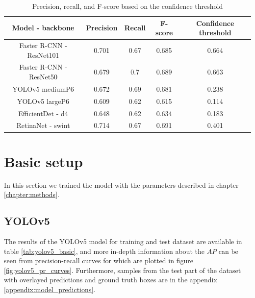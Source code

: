 \begin{table}
    \begin{tabular}{c||c|c|c|c}
        Model - backbone         & Precision & Recall & F-score & Confidence threshold \\ \hline \hline
        Faster R-CNN - ResNet101 & 0.701     & 0.67   & 0.685   & 0.664                \\ \hline
        Faster R-CNN - ResNet50  & 0.679     & 0.7    & 0.689   & 0.663                \\ \hline
        YOLOv5 mediumP6          & 0.672     & 0.69   & 0.681   & 0.238                \\ \hline
        YOLOv5 largeP6           & 0.609     & 0.62   & 0.615   & 0.114                \\ \hline
        EfficientDet - d4        & 0.648     & 0.62   & 0.634   & 0.183                \\ \hline
        RetinaNet - swint        & 0.714     & 0.67   & 0.691   & 0.401                \\ \hline
    \end{tabular}
    \caption{Precision, recall, and F-score based on the confidence threshold}
    \label{tab:model_prf4k}
\end{table}


\section{Basic setup}
In this section we trained the model with the parameters described in chapter \ref{chapter:methods}.
\subsection{YOLOv5}
The results of the YOLOv5 model for training and test dataset are available in table \ref{tab:yolov5_basic}, and more in-depth information about the $AP$ can be seen from precision-recall curves for which are plotted in figure \ref{fig:yolov5_pr_curves}. Furthermore, samples from the test part of the dataset with overlayed predictions and ground truth boxes are in the appendix \ref{appendix:model_predictions}.

